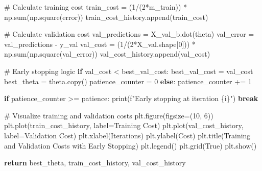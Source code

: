 \documentclass[
  letterpaper,
  DIV=11,
  numbers=noendperiod]{scrreprt}
\newenvironment{Shaded}{\begin{snugshade}}{\end{snugshade}}
\newcommand{\BuiltInTok}[1]{\textcolor[rgb]{0.00,0.23,0.31}{#1}}
\newcommand{\CommentTok}[1]{\textcolor[rgb]{0.37,0.37,0.37}{#1}}
\newcommand{\ControlFlowTok}[1]{\textcolor[rgb]{0.00,0.23,0.31}{\textbf{#1}}}
\newcommand{\DecValTok}[1]{\textcolor[rgb]{0.68,0.00,0.00}{#1}}
\newcommand{\NormalTok}[1]{\textcolor[rgb]{0.00,0.23,0.31}{#1}}
\newcommand{\OperatorTok}[1]{\textcolor[rgb]{0.37,0.37,0.37}{#1}}
\newcommand{\SpecialCharTok}[1]{\textcolor[rgb]{0.37,0.37,0.37}{#1}}
\newcommand{\SpecialStringTok}[1]{\textcolor[rgb]{0.13,0.47,0.30}{#1}}
\newcommand{\StringTok}[1]{\textcolor[rgb]{0.13,0.47,0.30}{#1}}
\newcommand{\VariableTok}[1]{\textcolor[rgb]{0.07,0.07,0.07}{#1}}
\begin{document}
\begin{Shaded}
\begin{Highlighting}[]
        \CommentTok{\# Calculate training cost}
\NormalTok{        train\_cost }\OperatorTok{=}\NormalTok{ (}\DecValTok{1}\OperatorTok{/}\NormalTok{(}\DecValTok{2}\OperatorTok{*}\NormalTok{m\_train)) }\OperatorTok{*}\NormalTok{ np.}\BuiltInTok{sum}\NormalTok{(np.square(error))}
\NormalTok{        train\_cost\_history.append(train\_cost)}
        
        \CommentTok{\# Calculate validation cost}
\NormalTok{        val\_predictions }\OperatorTok{=}\NormalTok{ X\_val\_b.dot(theta)}
\NormalTok{        val\_error }\OperatorTok{=}\NormalTok{ val\_predictions }\OperatorTok{{-}}\NormalTok{ y\_val}
\NormalTok{        val\_cost }\OperatorTok{=}\NormalTok{ (}\DecValTok{1}\OperatorTok{/}\NormalTok{(}\DecValTok{2}\OperatorTok{*}\NormalTok{X\_val.shape[}\DecValTok{0}\NormalTok{])) }\OperatorTok{*}\NormalTok{ np.}\BuiltInTok{sum}\NormalTok{(np.square(val\_error))}
\NormalTok{        val\_cost\_history.append(val\_cost)}
        
        \CommentTok{\# Early stopping logic}
        \ControlFlowTok{if}\NormalTok{ val\_cost }\OperatorTok{\textless{}}\NormalTok{ best\_val\_cost:}
\NormalTok{            best\_val\_cost }\OperatorTok{=}\NormalTok{ val\_cost}
\NormalTok{            best\_theta }\OperatorTok{=}\NormalTok{ theta.copy()}
\NormalTok{            patience\_counter }\OperatorTok{=} \DecValTok{0}
        \ControlFlowTok{else}\NormalTok{:}
\NormalTok{            patience\_counter }\OperatorTok{+=} \DecValTok{1}
            
        \ControlFlowTok{if}\NormalTok{ patience\_counter }\OperatorTok{\textgreater{}=}\NormalTok{ patience:}
            \BuiltInTok{print}\NormalTok{(}\SpecialStringTok{f"Early stopping at iteration }\SpecialCharTok{\{}\NormalTok{i}\SpecialCharTok{\}}\SpecialStringTok{"}\NormalTok{)}
            \ControlFlowTok{break}
            
    \CommentTok{\# Visualize training and validation costs}
\NormalTok{    plt.figure(figsize}\OperatorTok{=}\NormalTok{(}\DecValTok{10}\NormalTok{, }\DecValTok{6}\NormalTok{))}
\NormalTok{    plt.plot(train\_cost\_history, label}\OperatorTok{=}\StringTok{\textquotesingle{}Training Cost\textquotesingle{}}\NormalTok{)}
\NormalTok{    plt.plot(val\_cost\_history, label}\OperatorTok{=}\StringTok{\textquotesingle{}Validation Cost\textquotesingle{}}\NormalTok{)}
\NormalTok{    plt.xlabel(}\StringTok{\textquotesingle{}Iterations\textquotesingle{}}\NormalTok{)}
\NormalTok{    plt.ylabel(}\StringTok{\textquotesingle{}Cost\textquotesingle{}}\NormalTok{)}
\NormalTok{    plt.title(}\StringTok{\textquotesingle{}Training and Validation Costs with Early Stopping\textquotesingle{}}\NormalTok{)}
\NormalTok{    plt.legend()}
\NormalTok{    plt.grid(}\VariableTok{True}\NormalTok{)}
\NormalTok{    plt.show()}
    
    \ControlFlowTok{return}\NormalTok{ best\_theta, train\_cost\_history, val\_cost\_history}
\end{Highlighting}
\end{Shaded}
\end{document}
